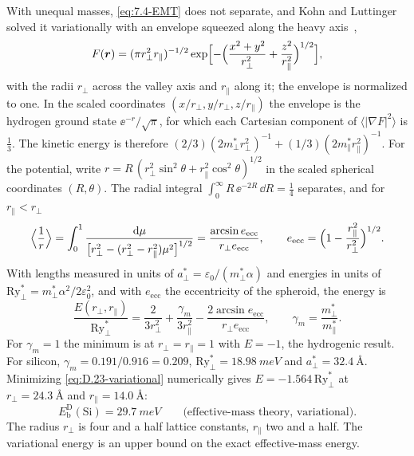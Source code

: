 With unequal masses, \cref{eq:7.4-EMT} does not separate, and Kohn and Luttinger solved it variationally with an envelope squeezed along the heavy axis~\cite{kohn1955theory},
\begin{equation*}
  F(\bm{r}) = (\pi r_\perp^2r_\parallel)^{-1/2}\exp\Bigl[-\Bigl(\frac{x^2 + y^2}{r_\perp^2} + \frac{z^2}{r_\parallel^2}\Bigr)^{1/2}\Bigr] ,
\end{equation*}
with the radii $r_\perp$ across the valley axis and $r_\parallel$ along it; the envelope is normalized to one. In the scaled coordinates $(x/r_\perp, y/r_\perp, z/r_\parallel)$ the envelope is the hydrogen ground state $\ee^{-r}/\sqrt\pi$, for which each Cartesian component of $\langle|\nabla F|^2\rangle$ is $\frac13$. The kinetic energy is therefore $(2/3)(2m^*_\perp r_\perp^2)^{-1} + (1/3)(2m^*_\parallel r_\parallel^2)^{-1}$. For the potential, write $r = R\,(r_\perp^2\sin^2\theta + r_\parallel^2\cos^2\theta)^{1/2}$ in the scaled spherical coordinates $(R,\theta)$. The radial integral $\int_0^\infty R\,\ee^{-2R}\,\dd R = \frac14$ separates, and for $r_\parallel < r_\perp$
\begin{equation*}
  \Bigl\langle\frac1r\Bigr\rangle = \int_0^1\frac{\mathrm{d}\mu}{\bigl[r_\perp^2 - (r_\perp^2 - r_\parallel^2)\mu^2\bigr]^{1/2}} = \frac{\arcsin e_{\mathrm{ecc}}}{r_\perp e_{\mathrm{ecc}}}, \qquad e_{\mathrm{ecc}} = \Bigl(1 - \frac{r_\parallel^2}{r_\perp^2}\Bigr)^{1/2} .
\end{equation*}
With lengths measured in units of $a^*_\perp = \varepsilon_0/(m^*_\perp\alpha)$ and energies in units of $\mathrm{Ry}^*_\perp = m^*_\perp\alpha^2/2\varepsilon_0^2$, and with $e_{\mathrm{ecc}}$ the eccentricity of the spheroid, the energy is
\begin{equation}
  \frac{E(r_\perp,r_\parallel)}{\mathrm{Ry}^*_\perp} = \frac{2}{3r_\perp^2} + \frac{\gamma_m}{3r_\parallel^2} - \frac{2\arcsin e_{\mathrm{ecc}}}{r_\perp e_{\mathrm{ecc}}}, \qquad \gamma_m = \frac{m^*_\perp}{m^*_\parallel} .
  \label{eq:D.23-variational}
\end{equation}
For $\gamma_m = 1$ the minimum is at $r_\perp = r_\parallel = 1$ with $E = -1$, the hydrogenic result. For silicon, $\gamma_m = 0.191/0.916 = 0.209$, $\mathrm{Ry}^*_\perp = \SI{18.98}{meV}$ and $a^*_\perp = \SI{32.4}{\angstrom}$. Minimizing \cref{eq:D.23-variational} numerically gives $E = -1.564\,\mathrm{Ry}^*_\perp$ at $r_\perp = \SI{24.3}{\angstrom}$ and $r_\parallel = \SI{14.0}{\angstrom}$:
\begin{equation}
  E_{\mathrm{b}}^{\mathrm{D}}(\mathrm{Si}) = \SI{29.7}{meV} \qquad\text{(effective-mass theory, variational)} .
  \label{eq:D.23-Si}
\end{equation}
The radius $r_\perp$ is four and a half lattice constants, $r_\parallel$ two and a half. The variational energy is an upper bound on the exact effective-mass energy.

